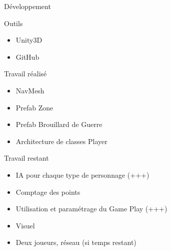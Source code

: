 \documentclass[10pt]{beamer}
\begin{document}
\begin{frame}{D\'eveloppement}

\begin{block}{Outils}
\begin{itemize}
\item  Unity3D
\item GitHub
\end{itemize}
\end{block}

\begin{block}{Travail r\'ealis\'e}
\begin{itemize}
\item NavMesh
 \item Prefab Zone
 \item Prefab Brouillard de Guerre
 \item Architecture de classes Player
\end{itemize}
\end{block}

\begin{block}{Travail restant}
\begin{itemize}
 \item IA pour chaque type de personnage (+++)
 \item Comptage des points
 \item Utilisation et param\'etrage du Game Play (+++)
 \item Visuel
 \item Deux joueurs, r\'eseau (si temps restant)
\end{itemize}
\end{block}

\end{frame}
\end{document}
